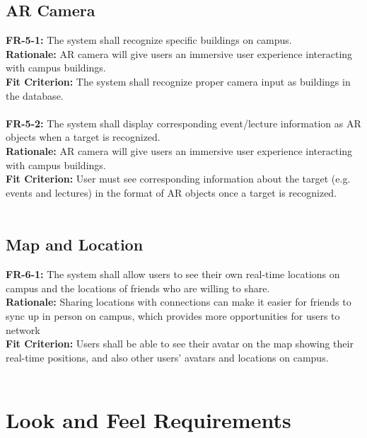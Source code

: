 \documentclass[12pt]{article}
\begin{document}
\subsection{AR Camera}
    \textbf{FR-5-1:} The system shall recognize specific buildings on campus.\\
    \textbf{Rationale:} AR camera will give users an immersive user experience interacting with campus buildings.\\
    \textbf{Fit Criterion:} The system shall recognize proper camera input as buildings in the database.\\\\
    \textbf{FR-5-2:} The system shall display corresponding event/lecture information as AR objects when a target is recognized.\\
    \textbf{Rationale:} AR camera will give users an immersive user experience interacting with campus buildings.\\
    \textbf{Fit Criterion:} User must see corresponding information about the target (e.g. events and lectures) in the format of AR objects once a target is recognized.\\\\

\subsection{Map and Location}
    \textbf{FR-6-1:} The system shall allow users to see their own real-time locations on campus and the locations of friends who are willing to share.\\
    \textbf{Rationale:} Sharing locations with connections can make it easier for friends to sync up in person on campus, which provides more opportunities for users to network\\
    \textbf{Fit Criterion:} Users shall be able to see their avatar on the map showing their real-time positions, and also other users' avatars and locations on campus.\\\\

\section{Look and Feel Requirements}
\end{document}
